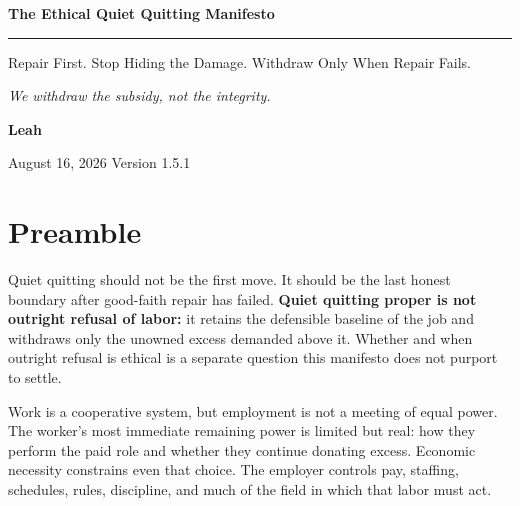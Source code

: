 \documentclass[11pt,oneside]{article}
\begin{document}
\hypersetup{pageanchor=false}

\begin{titlepage}
\thispagestyle{empty}
\vspace*{0.9in}

{\sffamily\bfseries\fontsize{31}{36}\selectfont\color{ManifestInk}
The Ethical Quiet Quitting Manifesto\par}

\vspace{0.5em}
{\color{ManifestRule}\rule{\textwidth}{1.2pt}}
\vspace{1.0em}

{\sffamily\fontsize{17}{23}\selectfont\color{ManifestGray}
Repair First. Stop Hiding the Damage. Withdraw Only When Repair
Fails.\par}

\vfill

\begin{tcolorbox}[
  enhanced,
  colback=ManifestLight,
  colframe=ManifestRule,
  boxrule=0pt,
  leftrule=4pt,
  arc=0pt,
  left=14pt,right=14pt,top=13pt,bottom=13pt
]
{\Large\itshape We withdraw the subsidy, not the integrity.}
\end{tcolorbox}
\vfill

{\sffamily\large\bfseries Leah\par}
\vspace{0.2em}
{\sffamily\color{ManifestGray}August 16, 2026 \quad Version 1.5.1\par}
\vspace{0.55in}
\end{titlepage}

\thispagestyle{plain}
\tableofcontents
\clearpage
{}
\hypersetup{pageanchor=true}

\hypertarget{preamble}{%
\section{Preamble}\label{preamble}}

Quiet quitting should not be the first move. It should be the last
honest boundary after good-faith repair has failed. \textbf{Quiet
quitting proper is not outright refusal of labor:} it retains the
defensible baseline of the job and withdraws only the unowned excess
demanded above it. Whether and when outright refusal is ethical is a
separate question this manifesto does not purport to settle.

Work is a cooperative system, but employment is not a meeting of equal
power. The worker's most immediate remaining power is limited but real:
how they perform the paid role and whether they continue donating
excess. Economic necessity constrains even that choice. The employer
controls pay, staffing, schedules, rules, discipline, and much of the
field in which that labor must act.
\end{document}
